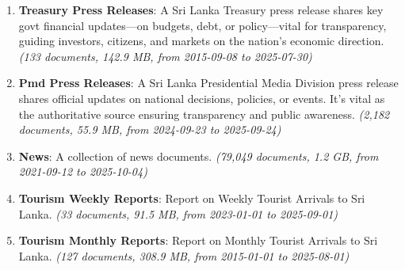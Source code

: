 \documentclass[10pt,a4paper]{article}%
\begin{document}
\begin{enumerate}
\item%
\textbf{Treasury Press Releases}: A Sri Lanka Treasury press release shares key govt financial updates—on budgets, debt, or policy—vital for transparency, guiding investors, citizens, and markets on the nation’s economic direction.\textit{ (133 documents,  142.9 MB,  from 2015{-}09{-}08 to 2025{-}07{-}30)}%
\item%
\textbf{Pmd Press Releases}: A Sri Lanka Presidential Media Division press release shares official updates on national decisions, policies, or events. It’s vital as the authoritative source ensuring transparency and public awareness.\textit{ (2,182 documents,  55.9 MB,  from 2024{-}09{-}23 to 2025{-}09{-}24)}%
\item%
\textbf{News}: A collection of news documents.\textit{ (79,049 documents,  1.2 GB,  from 2021{-}09{-}12 to 2025{-}10{-}04)}%
\item%
\textbf{Tourism Weekly Reports}: Report on Weekly Tourist Arrivals to Sri Lanka.\textit{ (33 documents,  91.5 MB,  from 2023{-}01{-}01 to 2025{-}09{-}01)}%
\item%
\textbf{Tourism Monthly Reports}: Report on Monthly Tourist Arrivals to Sri Lanka.\textit{ (127 documents,  308.9 MB,  from 2015{-}01{-}01 to 2025{-}08{-}01)}%
\end{enumerate}

%
\end{document}
